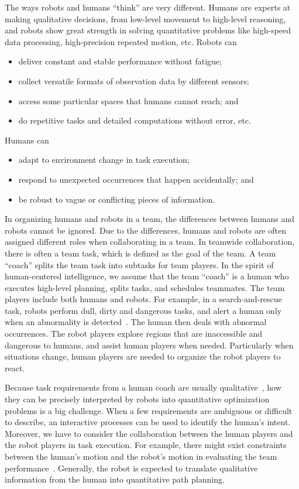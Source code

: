 \documentclass[phd]{byuprop}
\begin{document}
The ways robots and humans ``think'' are very different.
Humans are experts at making qualitative decisions, from low-level movement to high-level reasoning,
and robots show great strength in solving quantitative problems like high-speed data processing, high-precision repeated motion, etc.
Robots can
\begin{itemize}
\item deliver constant and stable performance without fatigue;
\item collect versatile formats of observation data by different sensors;
\item access some particular spaces that humans cannot reach; and
\item do repetitive tasks and detailed computations without error, etc.
\end{itemize}
Humans can
\begin{itemize}
\item adapt to environment change in task execution;
\item respond to unexpected occurrences that happen accidentally; and
\item be robust to vague or conflicting pieces of information. 
\end{itemize}
In organizing humans and robots in a team, the differences between humans and robots cannot be ignored.
Due to the differences, humans and robots are often assigned different roles when collaborating in a team.
In teamwide collaboration, there is often a team task, which is defined as the goal of the team.
A team ``coach'' splits the team task into subtasks for team players.
In the spirit of human-centered intelligence, we assume that the team ``coach'' is a human who executes high-level planning, splits tasks, and schedules teammates.
The team players include both humans and robots.
For example, in a search-and-rescue task, robots perform dull, dirty and dangerous tasks, and alert a human only when an abnormality is detected~\cite{Nourbakhsh2005}.
The human then deals with abnormal occurrences.
The robot players explore regions that are inaccessible and dangerous to humans, and assist human players when needed.
Particularly when situations change, human players are needed to organize the robot players to react.

Because task requirements from a human coach are usually qualitative~\cite{brenner2007mediating}, how they can be precisely interpreted by robots into quantitative optimization problems is a big challenge.
When a few requirements are ambiguous or difficult to describe, an interactive processes can be used to identify the human's intent.
Moreover, we have to consider the collaboration between the human players and the robot players in task execution.
For example, there might exist constraints between the human's motion and the robot's motion in evaluating the team performance~\cite{Yi2014a}.
Generally, the robot is expected to translate qualitative information from the human into quantitative path planning.
\end{document}
